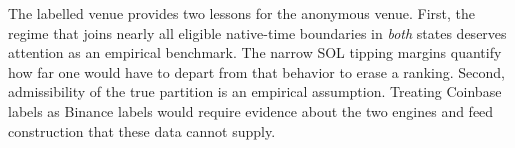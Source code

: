 The labelled venue provides two lessons for the anonymous venue. First, the regime that joins nearly all eligible native-time boundaries in \emph{both} states deserves attention as an empirical benchmark. The narrow SOL tipping margins quantify how far one would have to depart from that behavior to erase a ranking. Second, admissibility of the true partition is an empirical assumption. Treating Coinbase labels as Binance labels would require evidence about the two engines and feed construction that these data cannot supply.
